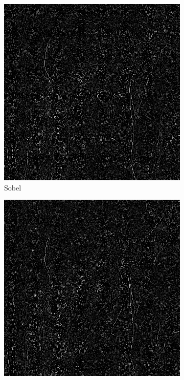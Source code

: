 \documentclass[a4paper]{article}
\begin{document}
\begin{figure}[H]
\centering
	\begin{subfigure}[t]{0.3\textwidth}
	\centering
	\includegraphics[width=\textwidth]{imagenesInforme/lenaNonMaximumSupressionSaltAndPepperSobel}
	\caption{Sobel}
	\end{subfigure}
	\begin{subfigure}[t]{0.3\textwidth}
	\centering
	\includegraphics[width=\textwidth]{imagenesInforme/lenaNonMaximumSupressionSaltAndPepperPrewitt}

\end{subfigure}
\end{figure}
\end{document}
